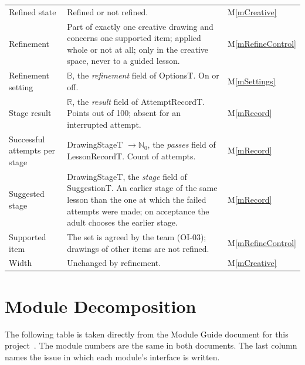\documentclass[12pt, titlepage]{article}
\newcommand{\mref}[1]{M\ref{#1}}
\begin{document}
{\begin{longtable}{@{}>{\raggedright\arraybackslash}p{}
>{\raggedright\arraybackslash}p{}
>{\raggedright\arraybackslash}p{}@{}}
Refined state & Refined or not refined. & \mref{mCreative}\\
Refinement & Part of exactly one creative drawing and concerns one supported item; applied whole or not at all; only in the creative space, never to a guided lesson. & \mref{mRefineControl}\\
Refinement setting & $\mathbb{B}$, the \emph{refinement} field of OptionsT. On or off. & \mref{mSettings}\\
Stage result & $\mathbb{R}$, the \emph{result} field of AttemptRecordT. Points out of 100; absent for an interrupted attempt. & \mref{mRecord}\\
Successful attempts per stage & DrawingStageT $\rightarrow \mathbb{N}_0$, the \emph{passes} field of LessonRecordT. Count of attempts. & \mref{mRecord}\\
Suggested stage & DrawingStageT, the \emph{stage} field of SuggestionT. An earlier stage of the same lesson than the one at which the failed attempts were made; on acceptance the adult chooses the earlier stage. & \mref{mRecord}\\
Supported item & The set is agreed by the team (OI-03); drawings of other items are not refined. & \mref{mRefineControl}\\
Width & Unchanged by refinement. & \mref{mCreative}\\
\end{longtable}
}

\section{Module Decomposition}

The following table is taken directly from the Module Guide document for this
project~\citep{MG}. The module numbers are the same in both documents. The last
column names the issue in which each module's interface is written.
\end{document}
